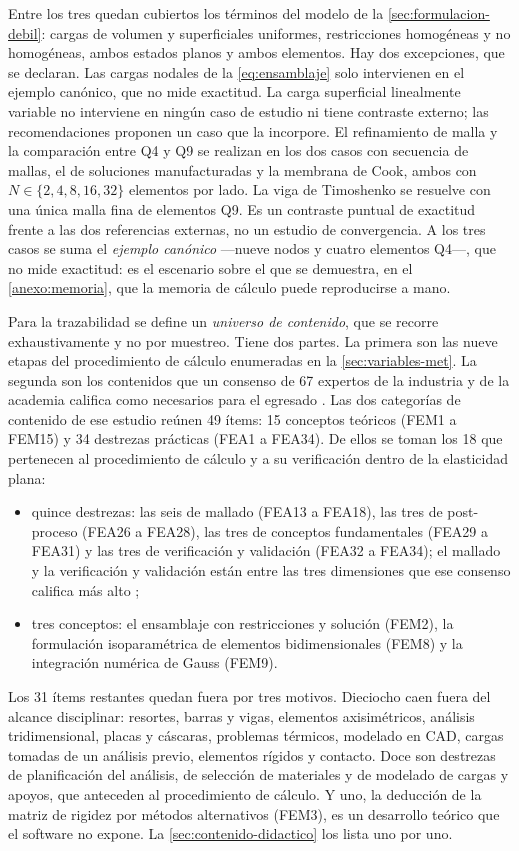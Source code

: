 Entre los tres quedan cubiertos los términos del modelo de la \autoref{sec:formulacion-debil}: cargas de volumen y superficiales uniformes, restricciones homogéneas y no homogéneas, ambos estados planos y ambos elementos. Hay dos excepciones, que se declaran. Las cargas nodales de la \autoref{eq:ensamblaje} solo intervienen en el ejemplo canónico, que no mide exactitud. La carga superficial linealmente variable no interviene en ningún caso de estudio ni tiene contraste externo; las recomendaciones proponen un caso que la incorpore. El refinamiento de malla y la comparación entre Q4 y Q9 se realizan en los dos casos con secuencia de mallas, el de soluciones manufacturadas y la membrana de Cook, ambos con $N\in\{2,4,8,16,32\}$ elementos por lado. La viga de Timoshenko se resuelve con una única malla fina de elementos Q9. Es un contraste puntual de exactitud frente a las dos referencias externas, no un estudio de convergencia. A los tres casos se suma el \emph{ejemplo canónico} —nueve nodos y cuatro elementos Q4—, que no mide exactitud: es el escenario sobre el que se demuestra, en el \autoref{anexo:memoria}, que la memoria de cálculo puede reproducirse a mano.

Para la trazabilidad se define un \emph{universo de contenido}, que se recorre exhaustivamente y no por muestreo. Tiene dos partes. La primera son las nueve etapas del procedimiento de cálculo enumeradas en la \autoref{sec:variables-met}. La segunda son los contenidos que un consenso de 67 expertos de la industria y de la academia califica como necesarios para el egresado \autocite[pp.~1162-1163]{perezsantiago2023fem}. Las dos categorías de contenido de ese estudio reúnen 49 ítems: 15 conceptos teóricos (FEM1 a FEM15) y 34 destrezas prácticas (FEA1 a FEA34). De ellos se toman los 18 que pertenecen al procedimiento de cálculo y a su verificación dentro de la elasticidad plana:
\begin{itemize}
    \item quince destrezas: las seis de mallado (FEA13 a FEA18), las tres de post-proceso (FEA26 a FEA28), las tres de conceptos fundamentales (FEA29 a FEA31) y las tres de verificación y validación (FEA32 a FEA34); el mallado y la verificación y validación están entre las tres dimensiones que ese consenso califica más alto \autocite[p.~1168]{perezsantiago2023fem};
    \item tres conceptos: el ensamblaje con restricciones y solución (FEM2), la formulación isoparamétrica de elementos bidimensionales (FEM8) y la integración numérica de Gauss (FEM9).
\end{itemize}
Los 31 ítems restantes quedan fuera por tres motivos. Dieciocho caen fuera del alcance disciplinar: resortes, barras y vigas, elementos axisimétricos, análisis tridimensional, placas y cáscaras, problemas térmicos, modelado en CAD, cargas tomadas de un análisis previo, elementos rígidos y contacto. Doce son destrezas de planificación del análisis, de selección de materiales y de modelado de cargas y apoyos, que anteceden al procedimiento de cálculo. Y uno, la deducción de la matriz de rigidez por métodos alternativos (FEM3), es un desarrollo teórico que el software no expone. La \autoref{sec:contenido-didactico} los lista uno por uno.

